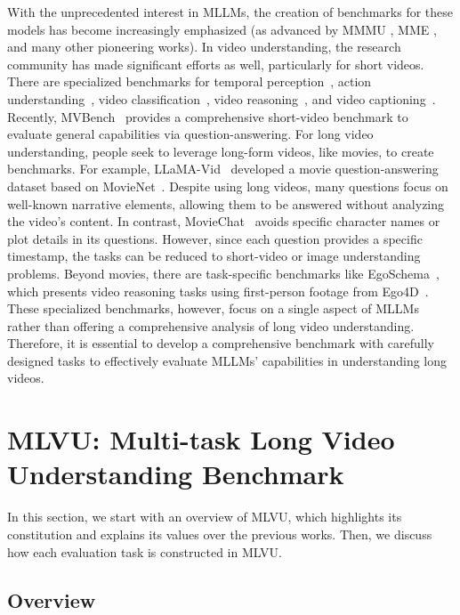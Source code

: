 With the unprecedented interest in MLLMs, the creation of benchmarks for these models has become increasingly emphasized (as advanced by MMMU \cite{yue2023mmmu}, MME \cite{fu2023mme}, and many other pioneering works). In video understanding, the research community has made significant efforts as well, particularly for short videos. There are specialized benchmarks for temporal perception~\cite{activitynetqa2019, star2021}, action understanding~\cite{star2021, paxion2023}, video classification~\cite{kinetics-2017}, video reasoning~\cite{funqa2023, nextqa2021}, and video captioning~\cite{msrvtt2016, howto100m2019}. Recently, MVBench~\cite{mvbench2023} provides a comprehensive short-video benchmark to evaluate general capabilities via question-answering. 
For long video understanding, people seek to leverage long-form videos, like movies, to create benchmarks. For example, LLaMA-Vid~\cite{llama-vid2023} developed a movie question-answering dataset based on MovieNet~\cite{movienet2020}. Despite using long videos, many questions focus on well-known narrative elements, allowing them to be answered without analyzing the video's content. In contrast, MovieChat~\cite{moviechat2023} avoids specific character names or plot details in its questions. However, since each question provides a specific timestamp, the tasks can be reduced to short-video or image understanding problems. Beyond movies, there are task-specific benchmarks like EgoSchema~\cite{egoschema2023}, which presents video reasoning tasks using first-person footage from Ego4D~\cite{ego4d2022}. These specialized benchmarks, however, focus on a single aspect of MLLMs rather than offering a comprehensive analysis of long video understanding. Therefore, it is essential to develop a comprehensive benchmark with carefully designed tasks to effectively evaluate MLLMs' capabilities in understanding long videos. 
\section{MLVU: Multi-task Long Video Understanding Benchmark}
\label{sec:dataset}

In this section, we start with an overview of MLVU, which highlights its constitution and explains its values over the previous works. Then, we discuss how each evaluation task is constructed in MLVU. 

\subsection{Overview}
\label{sec:benchoverview}

